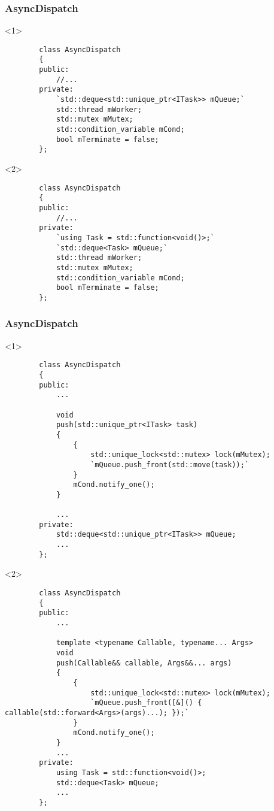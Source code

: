 \documentclass{beamer}
\begin{document}
\begin{frame}[fragile]
\frametitle{AsyncDispatch}
    
    \begin{onlyenv}<1>
    \begin{lstlisting}
        class AsyncDispatch
        {
        public:
            //...
        private:
            `std::deque<std::unique_ptr<ITask>> mQueue;`
            std::thread mWorker;
            std::mutex mMutex;
            std::condition_variable mCond;
            bool mTerminate = false;
        };
    \end{lstlisting}
    \end{onlyenv}
    
    \begin{onlyenv}<2>
    \begin{lstlisting}
        class AsyncDispatch
        {
        public:
            //...
        private:
            `using Task = std::function<void()>;`
            `std::deque<Task> mQueue;`
            std::thread mWorker;
            std::mutex mMutex;
            std::condition_variable mCond;
            bool mTerminate = false;
        };
    \end{lstlisting}
    \end{onlyenv}
\end{frame}

\begin{frame}[fragile]
\frametitle{AsyncDispatch}
    
    \begin{onlyenv}<1>
    \begin{lstlisting}
        class AsyncDispatch
        {
        public:
            ...

            void
            push(std::unique_ptr<ITask> task)
            {
                {
                    std::unique_lock<std::mutex> lock(mMutex);
                    `mQueue.push_front(std::move(task));`
                }
                mCond.notify_one();
            }

            ...
        private:
            std::deque<std::unique_ptr<ITask>> mQueue;
            ...
        };
    \end{lstlisting}
    \end{onlyenv}

    \begin{onlyenv}<2>
    \begin{lstlisting}
        class AsyncDispatch
        {
        public:
            ...

            template <typename Callable, typename... Args>
            void
            push(Callable&& callable, Args&&... args)
            {
                {
                    std::unique_lock<std::mutex> lock(mMutex);
                    `mQueue.push_front([&]() { callable(std::forward<Args>(args)...); });`
                }
                mCond.notify_one();
            }
            ...
        private:
            using Task = std::function<void()>;
            std::deque<Task> mQueue;
            ...
        };
    \end{lstlisting}
    \end{onlyenv}
\end{frame}
\end{document}
